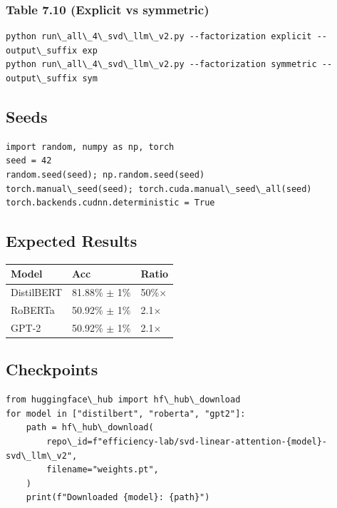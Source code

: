 \subsubsection{Table 7.10 (Explicit vs symmetric)}
\begin{lstlisting}
python run\_all\_4\_svd\_llm\_v2.py --factorization explicit --output\_suffix exp
python run\_all\_4\_svd\_llm\_v2.py --factorization symmetric --output\_suffix sym
\end{lstlisting}

\subsection{Seeds}

\begin{lstlisting}
import random, numpy as np, torch
seed = 42
random.seed(seed); np.random.seed(seed)
torch.manual\_seed(seed); torch.cuda.manual\_seed\_all(seed)
torch.backends.cudnn.deterministic = True
\end{lstlisting}

\subsection{Expected Results}

\begin{table}[H]
\centering
\small
\begin{tabular}{lll}
\toprule
\textbf{Model} & \textbf{Acc} & \textbf{Ratio} \\
\midrule
DistilBERT & 81.88\% $\pm$ 1\% & 50\%$\times$ \\
RoBERTa & 50.92\% $\pm$ 1\% & 2.1$\times$ \\
GPT-2 & 50.92\% $\pm$ 1\% & 2.1$\times$ \\
\bottomrule
\end{tabular}
\end{table}

\subsection{Checkpoints}

\begin{lstlisting}
from huggingface\_hub import hf\_hub\_download
for model in ["distilbert", "roberta", "gpt2"]:
    path = hf\_hub\_download(
        repo\_id=f"efficiency-lab/svd-linear-attention-{model}-svd\_llm\_v2",
        filename="weights.pt",
    )
    print(f"Downloaded {model}: {path}")
\end{lstlisting}

